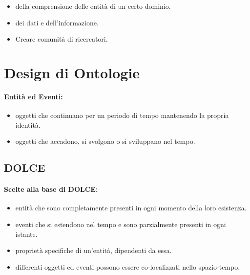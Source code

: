 
\begin{itemize}
  \item {} della comprensione delle entità di un certo dominio. 
  \item {} dei dati e dell'informazione. 
  \item Creare comunità di ricercatori.
\end{itemize}

\section{Design di Ontologie}

\paragraph{Entità ed Eventi:}

\begin{itemize}
  \item {} oggetti che continuano per un periodo di tempo mantenendo la propria identità. 
  \item {} oggetti che accadono, si svolgono o si sviluppano nel tempo.
\end{itemize}



\subsection{DOLCE}


\paragraph{Scelte alla base di DOLCE:}

\begin{itemize}
  \item {} entità  che sono completamente presenti in ogni momento della loro esistenza. 
  \item {} eventi che si estendono nel tempo e sono parzialmente presenti in ogni istante. 
  \item {} proprietà specifiche di un'entità, dipendenti da essa. 
  \item {} differenti oggetti ed eventi possono essere co-localizzati nello spazio-tempo.
\end{itemize}

